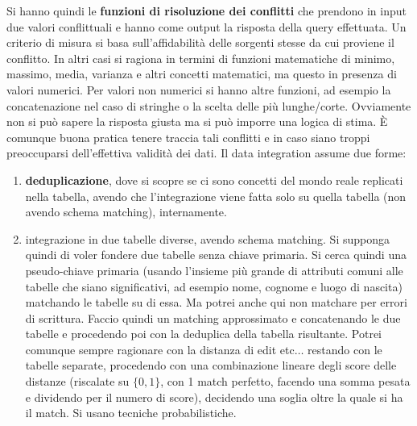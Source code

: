Si hanno quindi le \textbf{funzioni di risoluzione dei conflitti} che prendono in input due valori conflittuali e hanno come output la risposta della query effettuata. Un criterio di misura si basa sull'affidabilità delle sorgenti stesse da cui proviene il conflitto. In altri casi si ragiona in termini di funzioni matematiche di minimo, massimo, media, varianza e altri concetti matematici, ma questo in presenza di valori numerici. Per valori non numerici si hanno altre funzioni, ad esempio la concatenazione nel caso di stringhe o la scelta delle più lunghe/corte. Ovviamente non si può sapere la risposta giusta ma si può imporre una logica di stima. È comunque buona pratica tenere traccia tali conflitti e in caso siano troppi preoccuparsi dell'effettiva validità dei dati. Il data integration assume due forme:
\begin{enumerate}
  \item \textbf{deduplicazione}, dove si scopre se ci sono concetti del mondo reale replicati nella tabella, avendo che l'integrazione viene fatta solo su quella tabella (non avendo schema matching), internamente. 
  \item integrazione in due tabelle diverse, avendo schema matching. Si supponga quindi di voler fondere due tabelle senza chiave primaria. Si cerca quindi una pseudo-chiave primaria (usando l'insieme più grande di attributi comuni alle tabelle che siano significativi, ad esempio nome, cognome e luogo di nascita) matchando le tabelle su di essa. Ma potrei anche qui non matchare per errori di scrittura. Faccio quindi un matching approssimato e concatenando le due tabelle e procedendo poi con la deduplica della tabella risultante. Potrei comunque sempre ragionare con la distanza di edit etc$\ldots$ restando con le tabelle separate, procedendo con una combinazione lineare degli score delle distanze (riscalate su $\{0,1\}$, con 1 match perfetto, facendo una somma pesata e dividendo per il numero di score), decidendo una soglia oltre la quale si ha il match. Si usano tecniche probabilistiche. 
\end{enumerate}

